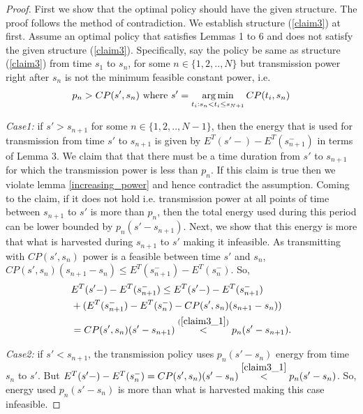 \begin{proof}
First we show that the optimal policy should have the given structure. The proof follows the method of  contradiction. We establish structure (\ref{claim3}) at first. Assume an optimal policy that satisfies Lemmas 1 to 6 and does not satisfy the given structure (\ref{claim3}). Specifically, say the policy be same as structure (\ref{claim3}) from time $s_{1}$ to $s_n$, for some $n\in \{1,2,..,N\}$ but transmission power right after $s_n$ is not the minimum feasible constant power, i.e.
\begin{align}
p_n>CP(s',s_n)\text{ where } s'=\argmin_{t_i: s_n < t_i \le s_{N+1}} CP(t_i,s_n)\label{claim3_1}
\end{align}

\textit{Case1: }if $s'>s_{n+1}$ for some $n\in \{1,2,..,N-1\}$, then the energy that is used for transmission from time $s'$ to $s_{n+1}$ is given by $E^T(s'-)-E^T(s_{n+1}^-)$ in terms of Lemma 3. We claim that that there must be a time duration from $s'$ to $s_{n+1}$ for which the transmission power is less than $p_n$. If this claim is true then we violate lemma \ref{increasing_power} and hence contradict the assumption. Coming to the claim, if it does not hold i.e. transmission power at all points of time between $s_{n+1}$ to $s'$ is more than $p_n$, then the total energy used during this period can be lower bounded by $p_n(s'-s_{n+1})$. Next, we show that this energy is more that what is harvested during $s_{n+1}$ to $s'$ making it infeasible. As transmitting with $CP(s',s_n)$ power is a feasible between time $s'$ and $s_n$, $CP(s',s_n)(s_{n+1}-s_n)\le E^T(s_{n+1}^-)-E^T(s_{n}^-)$. So, 
\begin{align}
&E^T(s'-)-E^T(s_{n+1}^-) \le E^T(s'-)-E^T(s_{n+1}^-)
\\
&+(E^T(s_{n+1}^-)-E^T(s_{n}^-)-CP(s',s_n)(s_{n+1}-s_n))
\\
&=CP(s',s_n)(s'-s_{n+1})\stackrel{(\ref{claim3_1})}{<}p_n (s'-s_{n+1}).
\end{align}

\textit{Case2: }if $s'<s_{n+1}$, the transmission policy uses $p_n(s'-s_{n})$ energy from time $s_n$ to $s'$. But $E^T(s'-)-E^T(s_{n}^-)=CP(s',s_n)(s'-s_{n})\stackrel{\ref{claim3_1}}{<}p_n(s'-s_{n})$. So, energy used $p_n(s'-s_{n})$ is more than what is harvested making this case infeasible.


\end{proof}
